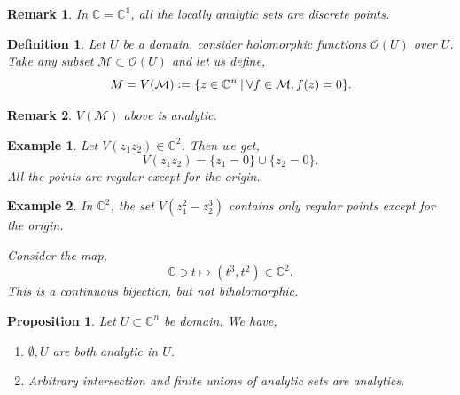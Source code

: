 \documentclass{article}
\newtheorem{proposition}{Proposition}[section]
\newtheorem{definition}{Definition}[section]
\newtheorem{remark}{Remark}[section]
\newtheorem{example}{Example}[section]
\newcommand{\defeq}{\vcentcolon=}
\newcommand{\C}[0]{\mathbb{C}}
\newcommand{\sep}[0]{\:|\:}
\begin{document}
\begin{remark}
  In $\C=\C^1$, all the locally analytic sets are discrete points.
\end{remark}

\begin{definition}
  Let $U$ be a domain, consider holomorphic functions $\mathcal{O}(U)$ over $U$. Take any subset $\mathcal{M}\subset\mathcal{O}(U)$ and let us define,
  \begin{equation*}
    M=V(\mathcal{M})\defeq \{z\in\C^n\sep \forall f\in\mathcal{M}, f(z) = 0\}.
  \end{equation*}
\end{definition}

\begin{remark}
  $V(\mathcal{M})$ above is analytic.
\end{remark}

\begin{example}
  Let $V(z_1z_2)\in \C^2$. Then we get,
  \begin{equation*}
    V(z_1z_2) = \{z_1=0\}\cup\{z_2=0\}.
  \end{equation*}
  All the points are regular except for the origin.
\end{example}

\begin{example}
  \label{example_cusp_non_biholomorphic}
  In $\C^2$, the set $V(z_1^2-z_2^3)$ contains only regular points except for the origin.
  \par Consider the map,
  \begin{equation*}
    \C\ni t\mapsto (t^3,t^2)\in \C^2.
  \end{equation*}
  This is a continuous bijection, but not biholomorphic.
  \begin{center}
  \end{center}
\end{example}

\begin{proposition}
  Let $U\subset\C^n$ be domain. We have,
  \begin{enumerate}[1).]
    \item $\emptyset,U$ are both analytic in $U$.
    \item Arbitrary intersection and finite unions of analytic sets are analytics.
  \end{enumerate}
\end{proposition}
\end{document}
